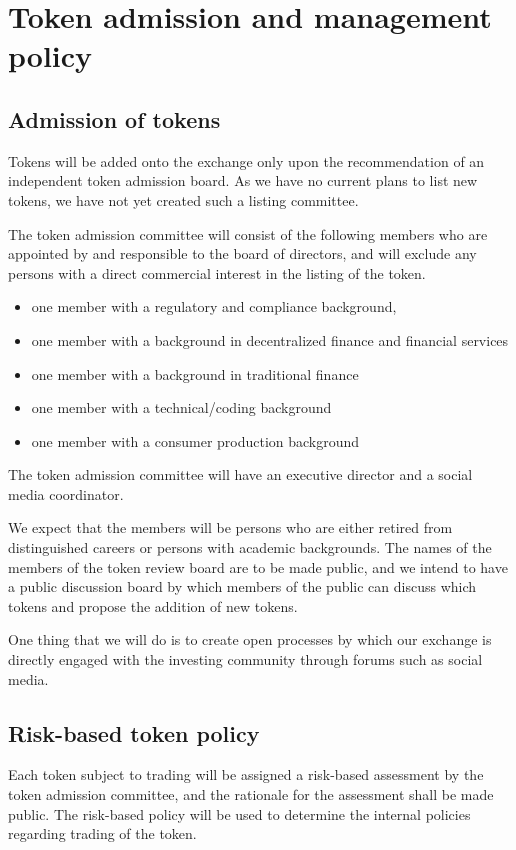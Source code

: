 \chapter{Token admission and management policy}

\section{Admission of tokens}

Tokens will be added onto the exchange only upon the recommendation of
an independent token admission board.  As we have no current plans to
list new tokens, we have not yet created such a listing committee.

The token admission committee will consist of the following members
who are appointed by and responsible to the board of directors, and
will exclude any persons with a direct commercial interest in the
listing of the token.

\begin{itemize}
  \item one member with a regulatory and compliance background,
  \item one member with a background in decentralized finance and
    financial services
  \item one member with a background in traditional finance
  \item one member with a technical/coding background
  \item one member with a consumer production background
\end{itemize}

The token admission committee will have an executive director and a
social media coordinator.

We expect that the members will be persons who are either retired from
distinguished careers or persons with academic backgrounds.  The names
of the members of the token review board are to be made public, and we
intend to have a public discussion board by which members of the
public can discuss which tokens and propose the addition of new
tokens.

One thing that we will do is to create open processes by which
our exchange is directly engaged with the investing community through
forums such as social media.

\section{Risk-based token policy}
Each token subject to trading will be assigned a risk-based assessment
by the token admission committee, and the rationale for the assessment
shall be made public.  The risk-based policy will be used to determine
the internal policies regarding trading of the token.

